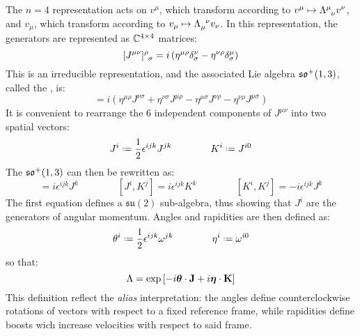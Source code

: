 The $ n = 4 $ representation acts on  $ v^\mu $, which transform according to $ v^\mu \mapsto \tensor{\Lambda}{^\mu_\nu} v^\nu $, and  $ v_\mu $, which transform according to $ v_\mu \mapsto \tensor{\Lambda}{_\mu^\nu} v_\nu $. In this representation, the generators are represented as $ \mathbb{C}^{4 \times 4} $ matrices:
\begin{equation}
  \tensor{[J^{\mu \nu}]}{^\rho_\sigma} = i \left( \eta^{\mu \rho} \delta^\nu_\sigma - \eta^{\nu \rho} \delta^\mu_\sigma \right)
  \label{eq:lor-gen}
\end{equation}
This is an irreducible representation, and the associated Lie algebra $ \mathfrak{so}^+(1,3) $, called the , is:
\begin{equation}
  [J^{\mu \nu}, J^{\rho \sigma}] = i \left( \eta^{\mu \rho} J^{\nu \sigma} + \eta^{\nu \sigma} J^{\mu \rho} - \eta^{\mu \sigma} J^{\nu \rho} - \eta^{\nu \rho} J^{\mu \sigma} \right)
  \label{eq:lor-comm}
\end{equation}
It is convenient to rearrange the 6 independent components of $ J^{\mu \nu} $ into two spatial vectors:
\begin{equation}
  J^i \defeq \frac{1}{2} \epsilon^{ijk} J^{jk}
  \qquad \qquad
  K^i \defeq J^{i0}
  \label{eq:lor-better-gen}
\end{equation}
The $ \mathfrak{so}^+(1,3) $ can then be rewritten as:
\begin{equation}
  [J^i, J^j] = i \epsilon^{ijk} J^k
  \qquad \qquad
  [J^i, K^j] = i \epsilon^{ijk} K^k
  \qquad \qquad
  [K^i, K^j] = - i \epsilon^{ijk} J^k
\end{equation}
The first equation defines a $ \mathfrak{su}(2) $ sub-algebra, thus showing that $ J^i $ are the generators of angular momentum. Angles and rapidities are then defined as:
\begin{equation}
  \theta^i \defeq \frac{1}{2} \epsilon^{ijk} \omega^{jk}
  \qquad \qquad
  \eta^i \defeq \omega^{i0}
\end{equation}
so that:
\begin{equation}
  \Lambda = \exp \left[ -i \boldsymbol{\theta} \cdot \mathbf{J} + i \boldsymbol{\eta} \cdot \mathbf{K} \right]
  \label{eq:lor-better-transf}
\end{equation}
This definition reflect the \textit{alias} interpretation: the angles define counterclockwise rotations of vectors with respect to a fixed reference frame, while rapidities define boosts wich increase velocities with respect to said frame.

